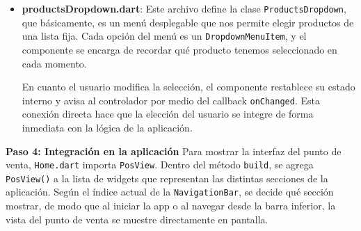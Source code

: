 \begin{itemize}
    \item \textbf{productsDropdown.dart}: Este archivo define la clase \texttt{ProductsDropdown}, que básicamente, es un menú desplegable que nos permite elegir productos de una lista fija. Cada opción del menú es un \texttt{DropdownMenuItem}, y el componente se encarga de recordar qué producto tenemos seleccionado en cada momento.

    En cuanto el usuario modifica la selección, el componente restablece su estado interno y avisa al controlador por medio del callback \texttt{onChanged}. Esta conexión directa hace que la elección del usuario se integre de forma inmediata con la lógica de la aplicación.
\end{itemize}

\textbf{Paso 4: Integración en la aplicación}  
Para mostrar la interfaz del punto de venta, \texttt{Home.dart} importa \texttt{PosView}. Dentro del método \texttt{build}, se agrega \texttt{PosView()} a la lista de widgets que representan las distintas secciones de la aplicación. Según el índice actual de la \texttt{NavigationBar}, se decide qué sección mostrar, de modo que al iniciar la app o al navegar desde la barra inferior, la vista del punto de venta se muestre directamente en pantalla.
